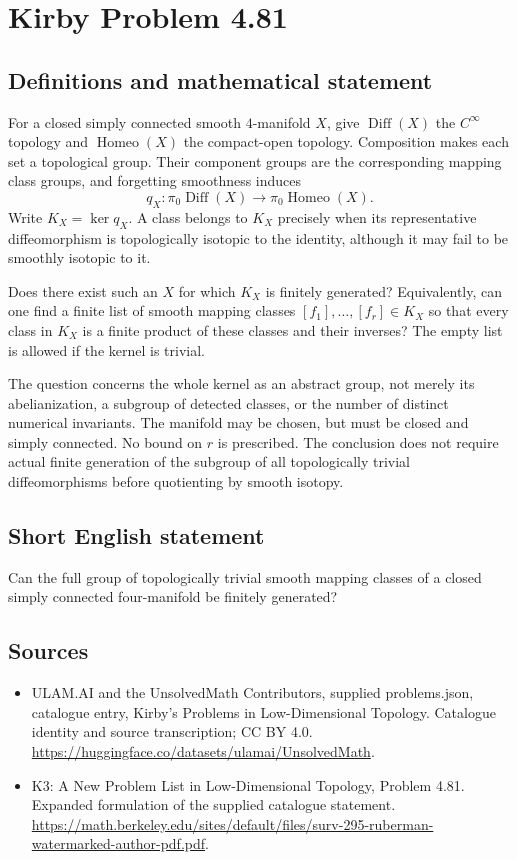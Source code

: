 \documentclass[11pt,a4paper]{article}
\begin{document}
\section*{Kirby Problem 4.81}\label{statement}

\subsection{Definitions and mathematical statement}
For a closed simply connected smooth $4$-manifold $X$, give
$\operatorname{Diff}(X)$ the $C^\infty$ topology and
$\operatorname{Homeo}(X)$ the compact-open topology. Composition
makes each set a topological group. Their component groups are
the corresponding mapping class groups, and forgetting smoothness
induces
\[
 q_X:\pi_0\operatorname{Diff}(X)\longrightarrow
                         \pi_0\operatorname{Homeo}(X).
\]
Write $K_X=\ker q_X$. A class belongs to $K_X$ precisely when
its representative diffeomorphism is topologically isotopic to the
identity, although it may fail to be smoothly isotopic to it.

Does there exist such an $X$ for which $K_X$ is finitely generated?
Equivalently, can one find a finite list of smooth mapping classes
$[f_1],\ldots,[f_r]\in K_X$ so that every class in $K_X$ is a
finite product of these classes and their inverses? The empty list
is allowed if the kernel is trivial.

The question concerns the whole kernel as an abstract group,
not merely its abelianization, a subgroup of detected classes, or
the number of distinct numerical invariants. The manifold may be
chosen, but must be closed and simply connected. No bound on
$r$ is prescribed. The conclusion does not require actual finite
generation of the subgroup of all topologically trivial diffeomorphisms
before quotienting by smooth isotopy.
\subsection{Short English statement}
Can the full group of topologically trivial smooth mapping classes of a closed simply connected four-manifold be finitely generated?
\subsection{Sources}
\begin{itemize}
\item[S1] ULAM.AI and the UnsolvedMath Contributors, supplied problems.json, catalogue entry, Kirby's Problems in Low-Dimensional Topology. Catalogue identity and source transcription; CC BY 4.0.
\url{https://huggingface.co/datasets/ulamai/UnsolvedMath}.
\item[S2] K3: A New Problem List in Low-Dimensional Topology, Problem 4.81. Expanded formulation of the supplied catalogue statement.
\url{https://math.berkeley.edu/sites/default/files/surv-295-ruberman-watermarked-author-pdf.pdf}.
\end{itemize}
\end{document}
